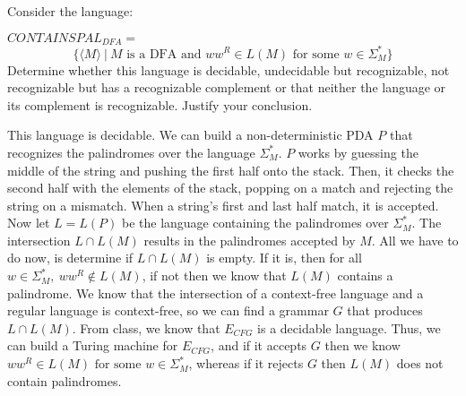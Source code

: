 

Consider the language:

$CONTAINSPAL_{DFA} =$
	\[  \{ \langle M \rangle ~|~ M \mbox{ is a DFA and } ww^R \in L(M) \mbox{ for some } w \in \Sigma_M^* \}
	\]	
	Determine whether this language is decidable, undecidable but recognizable, not recognizable but has a recognizable complement or that neither the language or its complement is recognizable. Justify your conclusion.
	
\begin{solution}

This language is decidable. We can build a non-deterministic PDA $P$ that recognizes the palindromes over the language $\Sigma_M^*$. $P$ works by guessing the middle of the string and pushing the first half onto the stack. Then, it checks the second half with the elements of the stack, popping on a match and rejecting the string on a mismatch. When a string's first and last half match, it is accepted. Now let $L = L(P)$ be the language containing the palindromes over $\Sigma_M^*$. The intersection $L \cap L(M)$ results in the palindromes accepted by $M$. All we have to do now, is determine if $L \cap L(M)$ is empty. If it is, then for all $w \in \Sigma_M^*, ~ ww^R \notin L(M)$, if not then we know that $L(M)$ contains a palindrome. We know that the intersection of a context-free language and a regular language is context-free, so we can find a grammar $G$ that produces $L \cap L(M)$. From class, we know that $E_{CFG}$ is a decidable language. Thus, we can build a Turing machine for $E_{CFG}$, and if it accepts $G$ then we know $ww^R \in L(M) \mbox{ for some } w \in \Sigma_M^*$, whereas if it rejects $G$ then $L(M)$ does not contain palindromes.

\end{solution}
